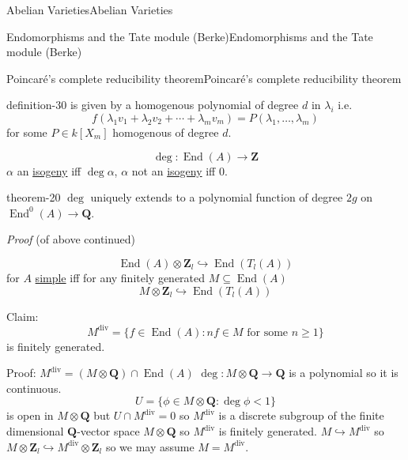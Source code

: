 \documentclass[10pt,]{book}
\makeatletter
\renewcommand*{\proofname}{Proof}
\renewenvironment{proof}[1][\proofname]{\par
  \pushQED{\qed}%
  \normalfont \topsep6\p@\@plus6\p@\relax
  \trivlist
  \item\relax
    {\itshape
    #1\@addpunct{.}}\hspace\labelsep\ignorespaces
}{%
  \popQED\endtrivlist\@endpefalse
}
\numberwithin{equation}{section}
\newcommand{\lb}{[}
\newcommand{\rb}{]}
\newcommand{\ZZ}{\mathbf{Z}}
\newcommand{\QQ}{\mathbf{Q}}
\DeclareMathOperator{\End}{End}
\newcommand{\lt}{<}
\makeatother
\begin{document}
\begin{chapterptx}{Abelian Varieties}{}{Abelian Varieties}{}{}
\begin{sectionptx}{Endomorphisms and the Tate module (Berke)}{}{Endomorphisms and the Tate module (Berke)}{}{}
\begin{subsectionptx}{Poincaré's complete reducibility theorem}{}{Poincaré's complete reducibility theorem}{}{}
\begin{definition}{}{definition-30}
is given by a homogenous polynomial of degree \(d\) in \(\lambda_i\) i.e.%
\begin{equation*}
f(\lambda_1 v_1 + \lambda_2 v_2 +\cdots + \lambda_m v_m) = P(\lambda_1,\ldots, \lambda_m)
\end{equation*}
for some \(P\in k\lb X_m\rb\) homogenous of degree \(d\).%
\end{definition}
\hypertarget{p-235}{}%
%
\begin{equation*}
\deg\colon \End(A) \to \ZZ
\end{equation*}
\(\alpha\) an \hyperref[def-supersing-isog-isog]{isogeny} iff \(\deg \alpha\), \(\alpha\) not an \hyperref[def-supersing-isog-isog]{isogeny} iff \(0\).%
\begin{theorem}{}{}{theorem-20}%
\hypertarget{p-236}{}%
\(\deg\) uniquely extends to a polynomial function of degree \(2g\) on \(\End^0(A) \to \QQ\).%
\end{theorem}
\begin{proof}\hypertarget{proof-44}{}
\hypertarget{p-237}{}%
(of above continued)%
\par
\hypertarget{p-238}{}%
%
\begin{equation*}
\End(A) \otimes \ZZ_l \hookrightarrow\End(T_l(A))
\end{equation*}
for \(A\) \hyperref[def-simple-av]{simple} iff for any finitely generated \(M \subseteq \End(A)\)%
\begin{equation*}
M \otimes \ZZ_l \hookrightarrow \End(T_l(A))
\end{equation*}
%
\par
\hypertarget{p-239}{}%
Claim:%
\begin{equation*}
M^{\text{div}} = \{f\in \End(A) : nf\in M \text{ for some }n\ge 1\}
\end{equation*}
is finitely generated.%
\par
\hypertarget{p-240}{}%
Proof: \(M^\text{div} = (M\otimes \QQ) \cap \End(A)\) \(\deg \colon M \otimes \QQ \to \QQ\) is a polynomial so it is continuous.%
\begin{equation*}
U = \{\phi\in M \otimes \QQ : \deg \phi \lt 1\}
\end{equation*}
is open in \(M \otimes \QQ\) but \(U \cap M^\text{div} = 0\) so \(M^\text{div} \) is a discrete subgroup of the finite dimensional \(\QQ\)-vector space \(M \otimes \QQ\) so \(M^\text{div}\) is finitely generated. \(M \hookrightarrow M^\text{div}\) so \(M \otimes \ZZ_l \hookrightarrow M^\text{div} \otimes \ZZ_l\) so  we may assume \(M = M^\text{div}\).%
\par

\end{proof}
\end{subsectionptx}
\end{sectionptx}
\end{chapterptx}
\end{document}
